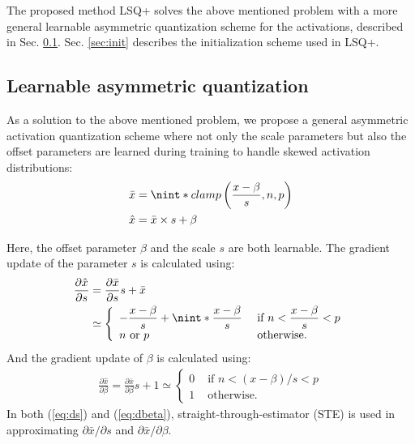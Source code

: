 \documentclass[10pt,twocolumn,letterpaper]{article}
\DeclarePairedDelimiter{\nint}\lfloor\rceil
\begin{document}
The proposed method LSQ+ solves the above mentioned problem with a more general learnable asymmetric quantization scheme for the activations, described in Sec. \ref{sec:asymm_formulation}. Sec. \ref{sec:init} describes the initialization scheme used in LSQ+. 





\subsection{Learnable asymmetric quantization}
\label{sec:asymm_formulation}
As a solution to the above mentioned problem, we propose a general asymmetric activation quantization scheme where not only the scale parameters but also the offset parameters are learned during training to handle skewed activation distributions:
\begin{align}
\begin{split}
    \bar{x} &= \nint*{clamp\left(\frac{x-\beta}{s}, n, p\right)} \\
    \hat{x} &= \bar{x}\times s + \beta
\end{split}
\label{asymm}
\end{align}

Here, the offset parameter $\beta$ and the scale $s$ are both learnable.
The gradient update of the parameter $s$ is calculated using:
\begin{align}
\begin{split}
    \frac{\partial \hat{x}}{\partial s} &=\frac{\partial \bar{x}}{\partial s} s+\bar{x} \\&\simeq 
    \left\{\begin{array}{ll}
        -\displaystyle\frac{x-\beta}{s}+\displaystyle\nint*{\frac{x-\beta}{s}} & \text { if } n<\displaystyle\frac{x-\beta}{s}<p \\
        n \text{ or } p & \text { otherwise. }
    \end{array}\right.
\end{split}
\label{eq:ds}
\end{align}
And the gradient update of $\beta$ is calculated using:
\begin{align}
\frac{\partial \hat{x}}{\partial \beta}=\frac{\partial \bar{x}}{\partial \beta} s+1 \simeq \left\{\begin{array}{ll}
0 & \text { if } n<(x-\beta) / s<p \\
1 & \text { otherwise. }
\end{array}\right.
\label{eq:dbeta}
\end{align}
In both (\ref{eq:ds}) and (\ref{eq:dbeta}), straight-through-estimator (STE) \cite{straight_through} is used in approximating $\partial \bar{x} / \partial s$ and $\partial \bar{x} / \partial \beta$.
\end{document}
